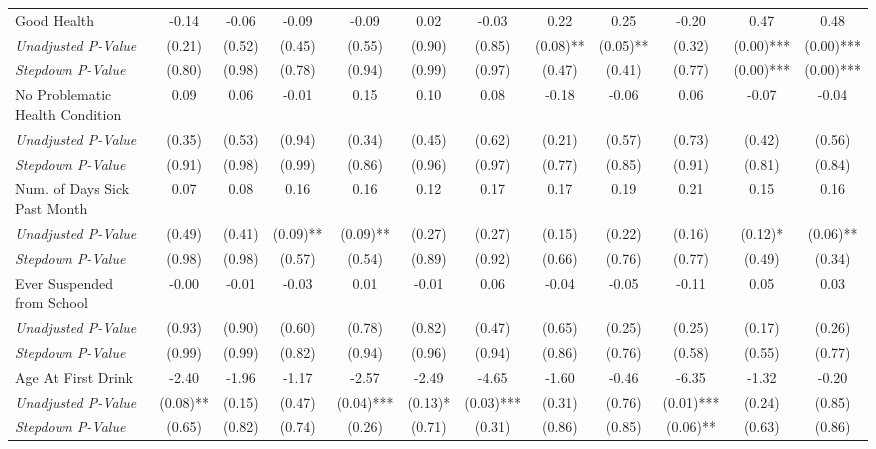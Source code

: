 \begin{tabular}{l c c c c c c c c c c c}
Good Health & -0.14 & -0.06 & -0.09 & -0.09 & 0.02 & -0.03 & 0.22 & 0.25 & -0.20 & 0.47 & 0.48 \\
\quad \textit{Unadjusted P-Value} & (0.21) & (0.52) & (0.45) & (0.55) & (0.90) & (0.85) & (0.08)** & (0.05)** & (0.32) & (0.00)*** & (0.00)*** \\
\quad \textit{Stepdown P-Value} & (0.80) & (0.98) & (0.78) & (0.94) & (0.99) & (0.97) & (0.47) & (0.41) & (0.77) & (0.00)*** & (0.00)*** \\
No Problematic Health Condition & 0.09 & 0.06 & -0.01 & 0.15 & 0.10 & 0.08 & -0.18 & -0.06 & 0.06 & -0.07 & -0.04 \\
\quad \textit{Unadjusted P-Value} & (0.35) & (0.53) & (0.94) & (0.34) & (0.45) & (0.62) & (0.21) & (0.57) & (0.73) & (0.42) & (0.56) \\
\quad \textit{Stepdown P-Value} & (0.91) & (0.98) & (0.99) & (0.86) & (0.96) & (0.97) & (0.77) & (0.85) & (0.91) & (0.81) & (0.84) \\
Num. of Days Sick Past Month & 0.07 & 0.08 & 0.16 & 0.16 & 0.12 & 0.17 & 0.17 & 0.19 & 0.21 & 0.15 & 0.16 \\
\quad \textit{Unadjusted P-Value} & (0.49) & (0.41) & (0.09)** & (0.09)** & (0.27) & (0.27) & (0.15) & (0.22) & (0.16) & (0.12)* & (0.06)** \\
\quad \textit{Stepdown P-Value} & (0.98) & (0.98) & (0.57) & (0.54) & (0.89) & (0.92) & (0.66) & (0.76) & (0.77) & (0.49) & (0.34) \\
Ever Suspended from School & -0.00 & -0.01 & -0.03 & 0.01 & -0.01 & 0.06 & -0.04 & -0.05 & -0.11 & 0.05 & 0.03 \\
\quad \textit{Unadjusted P-Value} & (0.93) & (0.90) & (0.60) & (0.78) & (0.82) & (0.47) & (0.65) & (0.25) & (0.25) & (0.17) & (0.26) \\
\quad \textit{Stepdown P-Value} & (0.99) & (0.99) & (0.82) & (0.94) & (0.96) & (0.94) & (0.86) & (0.76) & (0.58) & (0.55) & (0.77) \\
Age At First Drink & -2.40 & -1.96 & -1.17 & -2.57 & -2.49 & -4.65 & -1.60 & -0.46 & -6.35 & -1.32 & -0.20 \\
\quad \textit{Unadjusted P-Value} & (0.08)** & (0.15) & (0.47) & (0.04)*** & (0.13)* & (0.03)*** & (0.31) & (0.76) & (0.01)*** & (0.24) & (0.85) \\
\quad \textit{Stepdown P-Value} & (0.65) & (0.82) & (0.74) & (0.26) & (0.71) & (0.31) & (0.86) & (0.85) & (0.06)** & (0.63) & (0.86) \\
\bottomrule
\end{tabular}
